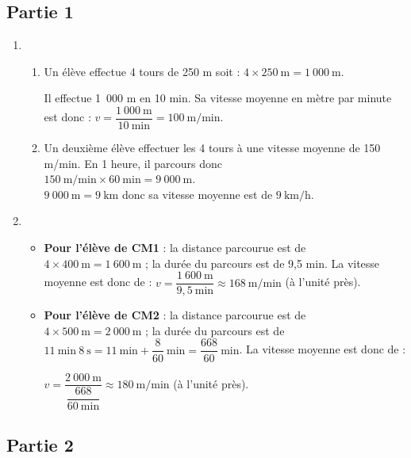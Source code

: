 \subsection*{Partie 1}

\begin{enumerate}
	\item 
	\begin{enumerate}
		\item Un élève effectue 4 tours de 250 m soit : $4\times250~\text{m}=1~000~\text{m}$.
		
		Il effectue 1~000 m en 10 min. Sa vitesse moyenne en mètre par minute est donc : $v=\dfrac{1~000~\text{m}}{10~\text{min}}=100~\text{m/min}$.
		
		\item Un deuxième élève effectuer les 4 tours à une vitesse moyenne de 150 m/min. En 1 heure, il parcours donc\\ $150~\text{m/min} \times 60~\text{min} = 9~000~\text{m}$.\\
		$9~000~\text{m} = 9~\text{km}$ donc sa vitesse moyenne est de $9~\text{km/h}$.
		
		\end{enumerate}
		
		\item \begin{itemize}
			\item \textbf{Pour l'élève de CM1} : la distance parcourue est de $4 \times 400~\text{m} = 1~600~\text{m}$ ; la durée du parcours est de 9,5 min. La vitesse moyenne est donc de : $v = \dfrac{1~600~\text{m}}{9,5~\text{min}} \approx 168~\text{m/min}$ (à l'unité près).			
			\item \textbf{Pour l'élève de CM2} : la distance parcourue est de $4 \times 500~\text{m} = 2~000~\text{m}$ ; la durée du parcours est de\\ 
			$11~\text{min}~8~\text{s} = 11~\text{min} + \dfrac{8}{60}~\text{min} = \dfrac{668}{60}~\text{min}$. 
			La vitesse moyenne est donc de :
			
			$v=\dfrac{2~000~\text{m}}{\dfrac{668}{60~\text{min}}} \approx 180~\text{m/min}$ (à l'unité près).
			
			
		\end{itemize}
	\end{enumerate}
	
\subsection*{Partie 2}
	
